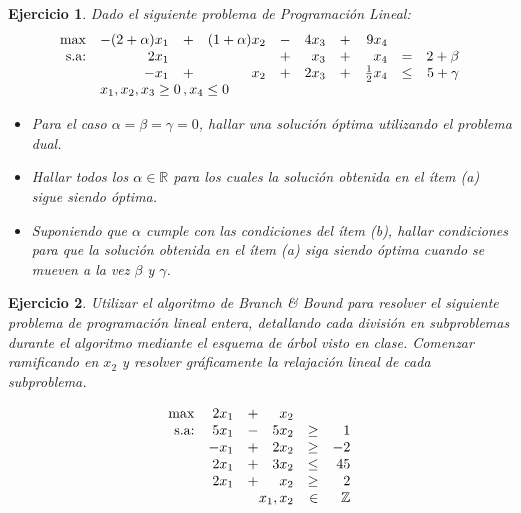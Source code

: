 \documentclass[a4paper,oneside,12pt]{amsart}
\newtheorem{quest}{Ejercicio}
\begin{document}
\begin{quest}
Dado el siguiente problema de Programación Lineal:
\[
\begin{array}{rrrrrrrrrr}
    \max & -(2+\alpha)x_1 & + & (1+\alpha) x_2 & - & 4x_3 & + & 9x_4 & & \\
    \text{s.a:} & 2x_1 &  &  & + & x_3& +& x_4 & = & 2 + \beta \\
     & -x_1& + &x_2 &+ &2x_3& + &\frac{1}{2}x_4& \leq & 5 + \gamma \\
     & \multicolumn{9}{l}{x_1,x_2,x_3\geq 0\, , x_4\leq 0}
\end{array}
\]
\begin{itemize}
    \item[(a)] Para el caso $\alpha=\beta=\gamma=0$, hallar una solución óptima utilizando el problema dual.
    \item[(b)] Hallar todos los $\alpha\in\mathbb{R}$ para los cuales la solución obtenida en el ítem (a) sigue siendo óptima.
    \item[(c)] Suponiendo que $\alpha$ cumple con las condiciones del ítem (b), hallar condiciones para que la solución obtenida en el ítem (a) siga siendo óptima cuando se mueven a la vez $\beta$ y $\gamma$.
\end{itemize}
\end{quest}




\begin{quest} 
Utilizar el algoritmo de Branch \& Bound para resolver el siguiente problema de programaci\'on lineal entera, detallando cada divisi\'on en subproblemas durante el algoritmo mediante el esquema de \'arbol visto en clase. Comenzar ramificando en $x_2$ y resolver gráficamente la relajación lineal de cada subproblema. 

\[\begin{array}{rrrrrrrrc}
\max & 2x_1 & + & x_2 &  &   \\
\text{s.a:}	 & 5x_1 & - & 5x_2 & \geq & 1  \\
			 & -x_1 & + & 2x_2 & \geq & -2 \\
			 &2x_1 & +  & 3x_2 & \leq & 45 \\
			 &	2x_1    & +  & x_2 & \geq & 2 \\
			 & \multicolumn{3}{r}{x_1,x_2} & \in & \mathbb{Z}
\end{array}
\]



\end{quest}

\end{document}
